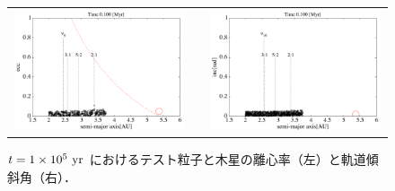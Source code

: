 \documentclass[11pt,a4paper,oneside,onecolumn]{jreport}
\begin{document}
\begin{figure}[H]
\begin{tabular}{ccc}
\begin{minipage}[t]{0.45\hsize}
\centering
\includegraphics[width=8cm]{./image/asteroid_ecc_100kyr.pdf}
\end{minipage} &
\begin{minipage}[t]{0.1\hsize}
\end{minipage} &
\begin{minipage}[t]{0.45\hsize}
\centering
\includegraphics[width=8cm]{./image/asteroid_inc_100kyr.pdf}
\end{minipage}\\
%
\end{tabular}
\caption{$t = 1 \times 10^5\ {\rm yr}$ におけるテスト粒子と木星の離心率（左）と軌道傾斜角（右）．\label{fig:asteroid_ecc_inc_100kyr}}
\end{figure}
\end{document}
